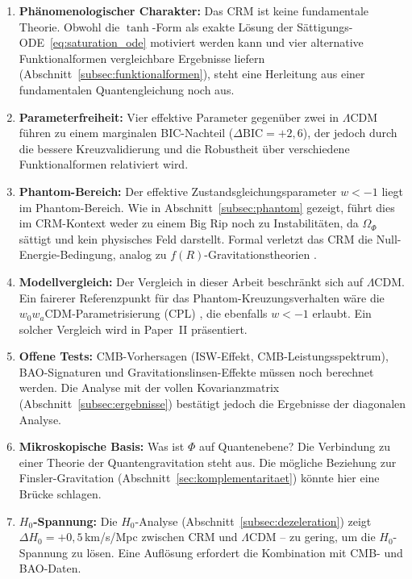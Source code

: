 \documentclass[aps,prd,twocolumn,superscriptaddress,nofootinbib]{revtex4-2}
\begin{document}
\begin{enumerate}
\item \textbf{Ph\"anomenologischer Charakter:} Das CRM ist keine fundamentale Theorie. Obwohl die $\tanh$-Form als exakte L\"osung der S\"attigungs-ODE~\eqref{eq:saturation_ode} motiviert werden kann und vier alternative Funktionalformen vergleichbare Ergebnisse liefern (Abschnitt~\ref{subsec:funktionalformen}), steht eine Herleitung aus einer fundamentalen Quantengleichung noch aus.
\item \textbf{Parameterfreiheit:} Vier effektive Parameter gegen\"uber zwei in $\Lambda$CDM f\"uhren zu einem marginalen BIC-Nachteil ($\Delta\mathrm{BIC} = +2{,}6$), der jedoch durch die bessere Kreuzvalidierung und die Robustheit \"uber verschiedene Funktionalformen relativiert wird.
\item \textbf{Phantom-Bereich:} Der effektive Zustandsgleichungsparameter $w < -1$ liegt im Phantom-Bereich. Wie in Abschnitt~\ref{subsec:phantom} gezeigt, f\"uhrt dies im CRM-Kontext weder zu einem Big Rip noch zu Instabilit\"aten, da $\Omega_\Phi$ s\"attigt und kein physisches Feld darstellt. Formal verletzt das CRM die Null-Energie-Bedingung, analog zu $f(R)$-Gravitationstheorien \cite{Sotiriou2010}.
\item \textbf{Modellvergleich:} Der Vergleich in dieser Arbeit beschr\"ankt sich auf $\Lambda$CDM. Ein fairerer Referenzpunkt f\"ur das Phantom-Kreuzungsverhalten w\"are die $w_0w_a$CDM-Parametrisierung (CPL) \cite{Chevallier2001, Linder2003}, die ebenfalls $w < -1$ erlaubt. Ein solcher Vergleich wird in Paper~II pr\"asentiert.
\item \textbf{Offene Tests:} CMB-Vorhersagen (ISW-Effekt, CMB-Leistungsspektrum), BAO-Signaturen und Gravitationslinsen-Effekte m\"ussen noch berechnet werden. Die Analyse mit der vollen Kovarianzmatrix (Abschnitt~\ref{subsec:ergebnisse}) best\"atigt jedoch die Ergebnisse der diagonalen Analyse.
\item \textbf{Mikroskopische Basis:} Was ist $\Phi$ auf Quantenebene? Die Verbindung zu einer Theorie der Quantengravitation steht aus. Die m\"ogliche Beziehung zur Finsler-Gravitation (Abschnitt~\ref{sec:komplementaritaet}) k\"onnte hier eine Br\"ucke schlagen.
\item \textbf{$H_0$-Spannung:} Die $H_0$-Analyse (Abschnitt~\ref{subsec:dezeleration}) zeigt $\Delta H_0 = +0{,}5\,$km/s/Mpc zwischen CRM und $\Lambda$CDM -- zu gering, um die $H_0$-Spannung zu l\"osen. Eine Aufl\"osung erfordert die Kombination mit CMB- und BAO-Daten.
\end{enumerate}
\end{document}
